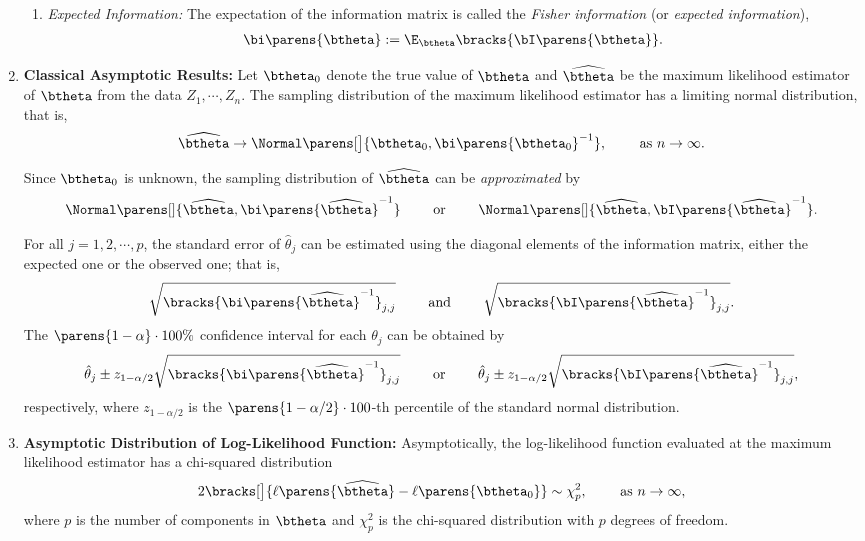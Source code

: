 \documentclass[12pt]{article}
\begin{document}
\begin{enumerate}[label=\textbf{\arabic*.}]
\begin{enumerate}
		\item \textit{Expected Information:} The expectation of the information matrix is called the \textit{Fisher information} (or \textit{expected information}), 
		\begin{align}
			\bi \parens{\btheta} := \E_{\btheta} \bracks{\bI \parens{\btheta} }. 
		\end{align}
	\end{enumerate}
	
	\item \textbf{Classical Asymptotic Results:} Let $\btheta_0$ denote the true value of $\btheta$ and $\widehat{\btheta}$ be the maximum likelihood estimator of $\btheta$ from the data $Z_1, \cdots, Z_n$. The sampling distribution of the maximum likelihood estimator has a limiting normal distribution, that is, 
	\begin{align}
		\widehat{\btheta} \to \Normal \parens[\big]{\btheta_0, \bi \parens{\btheta_0}^{-1}}, \qquad \text{ as } n \to \infty. 
	\end{align}
	
	Since $\btheta_0$ is unknown, the sampling distribution of $\widehat{\btheta}$ can be \emph{approximated} by 
	\begin{align}
		\Normal \parens[]{\widehat{\btheta}, \bi \parens{\widehat{\btheta}}^{-1}} \qquad \text{ or } \qquad \Normal \parens[]{\widehat{\btheta}, \bI \parens{\widehat{\btheta}}^{-1}}. 
	\end{align}
	
	For all $j = 1, 2, \cdots, p$, the standard error of $\hat{\theta}_j$ can be estimated using the diagonal elements of the information matrix, either the expected one or the observed one; that is, 
	\begin{align}
		\sqrt{\bracks{\bi \parens{\widehat{\btheta}}^{-1}}_{j,j}} \qquad \text{ and } \qquad \sqrt{\bracks{\bI \parens{\widehat{\btheta}}^{-1}}_{j,j}}.
	\end{align}
	The $\parens{1 - \alpha} \cdot 100\%$ confidence interval for each $\theta_j$ can be obtained by 
	\begin{align}
		\hat{\theta}_j \pm z_{1 - \alpha/2} \sqrt{\bracks{\bi \parens{\widehat{\btheta}}^{-1}}_{j,j}} \qquad \text{ or } \qquad \hat{\theta}_j \pm z_{1 - \alpha/2} \sqrt{\bracks{\bI \parens{\widehat{\btheta}}^{-1}}_{j,j}}, 
	\end{align}
	respectively, where $z_{1-\alpha/2}$ is the $\parens{1 - \alpha / 2} \cdot 100$-th percentile of the standard normal distribution.  
	
	\item \textbf{Asymptotic Distribution of Log-Likelihood Function:} Asymptotically, the log-likelihood function evaluated at the maximum likelihood estimator has a chi-squared distribution 
	\begin{equation}
		2 \bracks[\big]{\ell \parens{\widehat{\btheta}} - \ell \parens{\btheta_0}} \sim \chi^2_p, \qquad \text{ as } n \to \infty, 
	\end{equation} 
	where $p$ is the number of components in $\btheta$ and $\chi_p^2$ is the chi-squared distribution with $p$ degrees of freedom. 
	

\end{enumerate}
\end{document}
